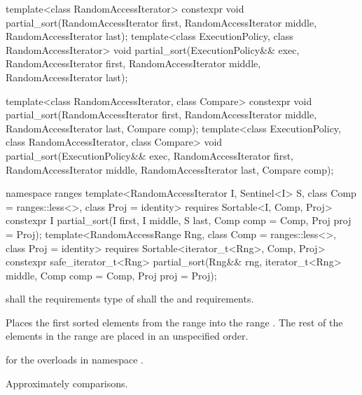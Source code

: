 %
\begin{itemdecl}
template<class RandomAccessIterator>
  constexpr void partial_sort(RandomAccessIterator first,
                              RandomAccessIterator middle,
                              RandomAccessIterator last);
template<class ExecutionPolicy, class RandomAccessIterator>
  void partial_sort(ExecutionPolicy&& exec,
                    RandomAccessIterator first,
                    RandomAccessIterator middle,
                    RandomAccessIterator last);

template<class RandomAccessIterator, class Compare>
  constexpr void partial_sort(RandomAccessIterator first,
                              RandomAccessIterator middle,
                              RandomAccessIterator last,
                              Compare comp);
template<class ExecutionPolicy, class RandomAccessIterator, class Compare>
  void partial_sort(ExecutionPolicy&& exec,
                    RandomAccessIterator first,
                    RandomAccessIterator middle,
                    RandomAccessIterator last,
                    Compare comp);
\end{itemdecl}
\begin{addedblock}
\begin{itemdecl}
namespace ranges {
  template<RandomAccessIterator I, Sentinel<I> S, class Comp = ranges::less<>,
      class Proj = identity>
    requires Sortable<I, Comp, Proj>
    constexpr I
      partial_sort(I first, I middle, S last, Comp comp = Comp{}, Proj proj = Proj{});
  template<RandomAccessRange Rng, class Comp = ranges::less<>, class Proj = identity>
    requires Sortable<iterator_t<Rng>, Comp, Proj>
    constexpr safe_iterator_t<Rng>
      partial_sort(Rng&& rng, iterator_t<Rng> middle, Comp comp = Comp{},
                   Proj proj = Proj{});
}
\end{itemdecl}
\end{addedblock}

\begin{itemdescr}
\pnum
\requires
{}
 shall  the
requirements  type of  shall  the
 and
 requirements.

\pnum
\effects
Places the first
sorted elements from the range
into the range
.
The rest of the elements in the range
are placed in an unspecified order.
%

\begin{addedblock}
\pnum
\returns {} for the overloads in namespace .
\end{addedblock}

\pnum
\complexity
Approximately
comparisons.
\end{itemdescr}


